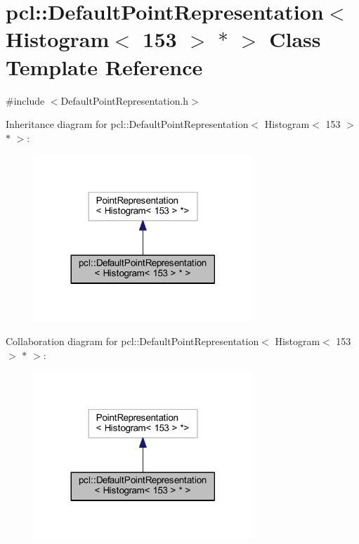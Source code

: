 \hypertarget{classpcl_1_1_default_point_representation_3_01_histogram_3_01153_01_4_01_5_01_4}{}\section{pcl\+:\+:Default\+Point\+Representation$<$ Histogram$<$ 153 $>$ $\ast$ $>$ Class Template Reference}
\label{classpcl_1_1_default_point_representation_3_01_histogram_3_01153_01_4_01_5_01_4}


{\ttfamily \#include $<$Default\+Point\+Representation.\+h$>$}



Inheritance diagram for pcl\+:\+:Default\+Point\+Representation$<$ Histogram$<$ 153 $>$ $\ast$ $>$\+:
\nopagebreak
\begin{figure}[H]
\begin{center}
\leavevmode
\includegraphics[width=233pt]{classpcl_1_1_default_point_representation_3_01_histogram_3_01153_01_4_01_5_01_4__inherit__graph}
\end{center}
\end{figure}


Collaboration diagram for pcl\+:\+:Default\+Point\+Representation$<$ Histogram$<$ 153 $>$ $\ast$ $>$\+:
\nopagebreak
\begin{figure}[H]
\begin{center}
\leavevmode
\includegraphics[width=233pt]{classpcl_1_1_default_point_representation_3_01_histogram_3_01153_01_4_01_5_01_4__coll__graph}
\end{center}
\end{figure}
